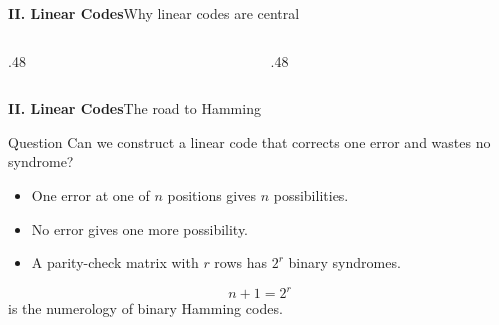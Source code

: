 
\begin{frame}{\textbf{II. Linear Codes}}{Why linear codes are central}
\small
\begin{columns}[T,onlytextwidth]
  \begin{column}{.48\textwidth}
  \end{column}
  \begin{column}{.48\textwidth}
  \end{column}
\end{columns}
\end{frame}

\begin{frame}{\textbf{II. Linear Codes}}{The road to Hamming}
\small
\begin{block}{Question}
Can we construct a linear code that corrects one error and wastes no syndrome?
\end{block}
\begin{itemize}
  \item One error at one of $n$ positions gives $n$ possibilities.
  \item No error gives one more possibility.
  \item A parity-check matrix with $r$ rows has $2^r$ binary syndromes.
\end{itemize}
\[
  n+1=2^r
\]
is the numerology of binary Hamming codes.
\end{frame}
